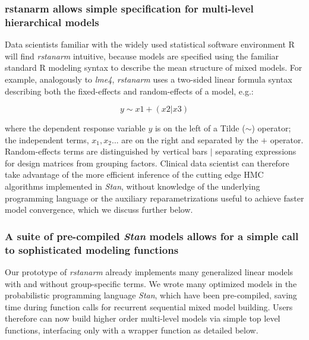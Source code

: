 \documentclass[11pt,notitlepage]{article}
\begin{document}
\subsubsection*{rstanarm allows simple specification for multi-level hierarchical models}

Data scientists familiar with the widely used statistical software environment R will 
find \textit{rstanarm} intuitive, because models are specified using the familiar 
standard R modeling syntax to describe the mean structure of mixed models. 
For example, analogously to \textit{lme4}, \textit{rstanarm} uses a two-sided 
linear formula syntax describing both the fixed-effects and random-effects of 
a model, e.g.:

\begin{figure}
\vspace{-30pt}
\begin{equation}
y \sim x1 +(x2|x3)
\end{equation}
\vspace{-40pt}
\end{figure}

where the dependent response variable $y$ is on the left of a Tilde ($\sim$) operator; 
the independent terms, $x_1, x_2...$ are on the right and separated by the $+$ 
operator. Random-effects terms are distinguished by vertical bars $|$ 
separating expressions for design matrices from grouping factors. Clinical data 
scientist can therefore take advantage of the  more efficient inference of the 
cutting edge HMC algorithms implemented in \textit{Stan}, without knowledge of 
the underlying programming language or the auxiliary reparametrizations useful to 
achieve faster model convergence, which we discuss further below.

\subsubsection*{A suite of pre-compiled \textit{Stan} models allows for a simple call to sophisticated modeling functions}

Our prototype of \textit{rstanarm} already implements many generalized linear 
models with and without group-specific terms. We wrote many optimized models 
in the probabilistic programming language \textit{Stan}, which have been 
pre-compiled, saving time during function calls for recurrent sequential 
mixed model building. Users therefore can now build higher order multi-level models via simple top level functions, interfacing only with a wrapper function as detailed below.
\end{document}
